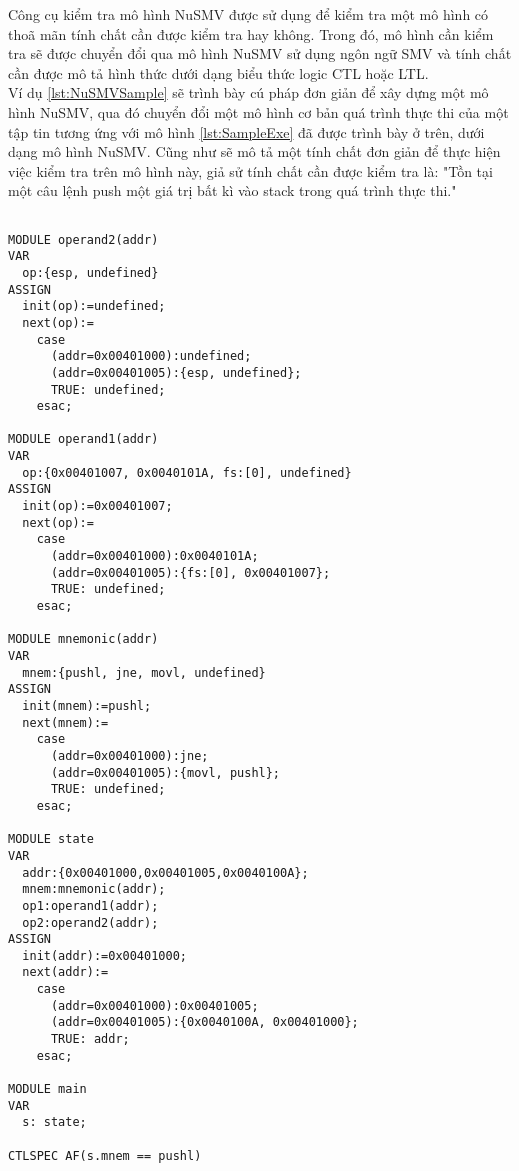 \hspace{0.5cm}Công cụ kiểm tra mô hình NuSMV được sử dụng để kiểm tra một mô hình có thoã mãn tính chất cần được kiểm tra hay không. Trong đó, mô hình cần kiểm tra sẽ được chuyển đổi qua mô hình NuSMV sử dụng ngôn ngữ SMV và tính chất cần được mô tả hình thức dưới dạng biểu thức logic CTL hoặc LTL.\\

\hspace{0.5cm}Ví dụ \ref {lst:NuSMVSample} sẽ trình bày cú pháp đơn giản để xây dựng một mô hình NuSMV, qua đó chuyển đổi một mô hình cơ bản quá trình thực thi của một tập tin tương ứng với mô hình \ref {lst:SampleExe} đã được trình bày ở trên, dưới dạng mô hình NuSMV. Cũng như sẽ mô tả một tính chất đơn giản để thực hiện việc kiểm tra trên mô hình này, giả sử tính chất cần được kiểm tra là: "Tồn tại một câu lệnh push một giá trị bất kì vào stack trong quá trình thực thi."

\begin{code}
\begin{lstlisting}[captionpos=b,caption={Ví dụ về kiểm tra mô hình trên NuSMV},label={lst:NuSMVSample},frame=single]

MODULE operand2(addr)
VAR
  op:{esp, undefined}
ASSIGN
  init(op):=undefined;
  next(op):=
    case
      (addr=0x00401000):undefined;
      (addr=0x00401005):{esp, undefined};
      TRUE: undefined;
    esac;

MODULE operand1(addr)
VAR
  op:{0x00401007, 0x0040101A, fs:[0], undefined}
ASSIGN
  init(op):=0x00401007;
  next(op):=
    case
      (addr=0x00401000):0x0040101A;
      (addr=0x00401005):{fs:[0], 0x00401007};
      TRUE: undefined;
    esac;

MODULE mnemonic(addr)
VAR
  mnem:{pushl, jne, movl, undefined}
ASSIGN
  init(mnem):=pushl;
  next(mnem):=
    case
      (addr=0x00401000):jne;
      (addr=0x00401005):{movl, pushl};
      TRUE: undefined;
    esac;

MODULE state
VAR
  addr:{0x00401000,0x00401005,0x0040100A};
  mnem:mnemonic(addr);
  op1:operand1(addr);
  op2:operand2(addr);
ASSIGN
  init(addr):=0x00401000;
  next(addr):=
    case
      (addr=0x00401000):0x00401005;
      (addr=0x00401005):{0x0040100A, 0x00401000};
      TRUE: addr;
    esac;

MODULE main
VAR
  s: state;

CTLSPEC AF(s.mnem == pushl)

\end{lstlisting}
\end{code}

